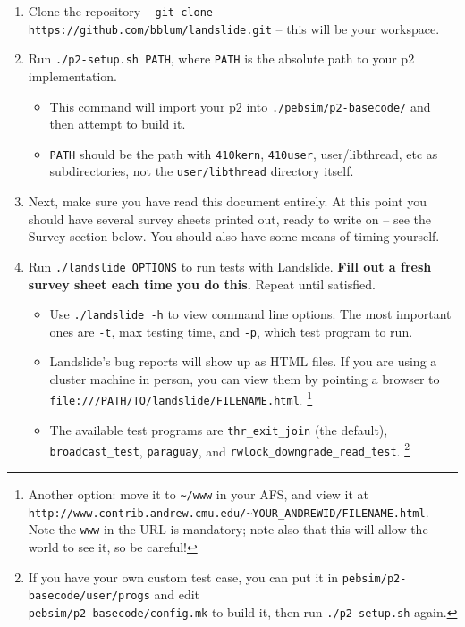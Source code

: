 \documentclass{article}
\begin{document}
\begin{enumerate}
	\item Clone the repository -- {\tt git clone https://github.com/bblum/landslide.git} -- this will be your workspace.
	\item Run {\tt ./p2-setup.sh PATH}, where {\tt PATH} is the absolute path to your p2 implementation.
		\begin{itemize}
			\item This command will import your p2 into {\tt ./pebsim/p2-basecode/} and then attempt to build it.
			\item {\tt PATH} should be the path with {\tt 410kern}, {\tt 410user}, {user/libthread}, etc as subdirectories, not the {\tt user/libthread} directory itself.
		\end{itemize}
	\item Next, make sure you have read this document entirely. At this point you should have several survey sheets printed out, ready to write on -- see the Survey section below. You should also have some means of timing yourself.
	\item Run {\tt ./landslide OPTIONS} to run tests with Landslide. {\bf Fill out a fresh survey sheet each time you do this.} Repeat until satisfied.
		\begin{itemize}
			\item Use {\tt ./landslide -h} to view command line options. The most important ones are {\tt -t}, max testing time, and {\tt -p}, which test program to run.
			\item Landslide's bug reports will show up as HTML files. If you are using a cluster machine in person, you can view them by pointing a browser to {\tt file:///PATH/TO/landslide/FILENAME.html}.
				\footnote{Another option: move it to {\tt \textasciitilde/www} in your AFS, and view it at {\tt http://www.contrib.andrew.cmu.edu/\textasciitilde{}YOUR\_ANDREWID/FILENAME.html}. Note the {\tt www} in the URL is mandatory; note also that this will allow the world to see it, so be careful!}
			\item The available test programs are {\tt thr\_exit\_join} (the default), {\tt broadcast\_test}, {\tt paraguay}, and {\tt rwlock\_downgrade\_read\_test}.
				\footnote{If you have your own custom test case, you can put it in {\tt pebsim/p2-basecode/user/progs} and edit \\ {\tt pebsim/p2-basecode/config.mk} to build it, then run {\tt ./p2-setup.sh} again.}
		\end{itemize}
\end{enumerate}
\end{document}

